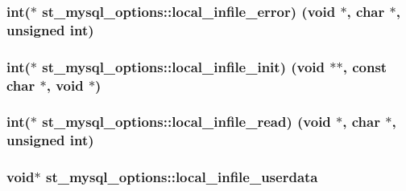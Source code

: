 \subsubsection[{local\+\_\+infile\+\_\+error}]{\setlength{\rightskip}{0pt plus 5cm}int($\ast$ st\+\_\+mysql\+\_\+options\+::local\+\_\+infile\+\_\+error) (void $\ast$, char $\ast$, unsigned int)}\label{structst__mysql__options_a79b831a574398e1ba37f0c7052318269}
\hypertarget{structst__mysql__options_a3524e3b6573ae25e1b3f26b19d818f10}{}
\subsubsection[{local\+\_\+infile\+\_\+init}]{\setlength{\rightskip}{0pt plus 5cm}int($\ast$ st\+\_\+mysql\+\_\+options\+::local\+\_\+infile\+\_\+init) (void $\ast$$\ast$, const char $\ast$, void $\ast$)}\label{structst__mysql__options_a3524e3b6573ae25e1b3f26b19d818f10}
\hypertarget{structst__mysql__options_adff315c42cebf0390d3d14f1bee762bc}{}
\subsubsection[{local\+\_\+infile\+\_\+read}]{\setlength{\rightskip}{0pt plus 5cm}int($\ast$ st\+\_\+mysql\+\_\+options\+::local\+\_\+infile\+\_\+read) (void $\ast$, char $\ast$, unsigned int)}\label{structst__mysql__options_adff315c42cebf0390d3d14f1bee762bc}
\hypertarget{structst__mysql__options_a54cbdc47b238a839eff42269b871380d}{}
\subsubsection[{local\+\_\+infile\+\_\+userdata}]{\setlength{\rightskip}{0pt plus 5cm}void$\ast$ st\+\_\+mysql\+\_\+options\+::local\+\_\+infile\+\_\+userdata}\label{structst__mysql__options_a54cbdc47b238a839eff42269b871380d}
\hypertarget{structst__mysql__options_a70de1a0467629fc3ccb1b0c12431fb41}{}

